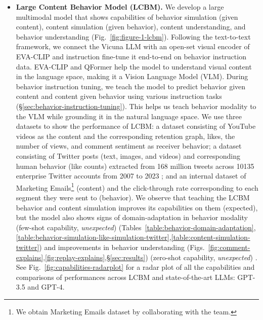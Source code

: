 \begin{itemize}[leftmargin=*]
    \item\textbf{Large Content Behavior Model (LCBM).} We develop a large multimodal model that shows capabilities of behavior simulation (given content), content simulation (given behavior), content understanding, and behavior understanding (Fig.~\ref{fig:figure-1-lcbm}). Following the text-to-text framework, we connect the Vicuna LLM \citep{touvron2023llama,vicuna2023} with an open-set visual encoder of EVA-CLIP \citep{sun2023eva} and instruction fine-tune it end-to-end on behavior instruction data. EVA-CLIP and QFormer \citep{li2023blip2} help the model to understand visual content in the language space, making it a Vision Language Model (VLM). During behavior instruction tuning, we teach the model to predict behavior given content and content given behavior using various instruction tasks (\S\ref{sec:behavior-instruction-tuning}). This helps us teach behavior modality to the VLM while grounding it in the natural language space. We use three datasets to show the performance of LCBM: a dataset consisting of YouTube videos as the content and the corresponding retention graph, likes, the number of views, and comment sentiment as receiver behavior; a dataset consisting of Twitter posts (text, images, and videos) and corresponding human behavior (like counts) extracted from 168 million tweets across 10135 enterprise Twitter accounts from 2007 to 2023 \cite{khurana2023behavior}; and an internal dataset of \companyName Marketing Emails\footnote[6]{We obtain \companyName Marketing Emails dataset by collaborating with the \companyName team.} (content) and the click-through rate corresponding to each segment they were sent to (behavior). We observe that teaching the LCBM behavior and content simulation improves its capabilities on them (expected), but the model also shows signs of domain-adaptation in behavior modality (few-shot capability, \textit{unexpected}) (Tables~\ref{table:behavior-domain-adaptation},\ref{table:behavior-simulation-like-simulation-twitter},\ref{table:content-simulation-twitter}) and improvements in behavior understanding (Figs.~\ref{fig:comment-explains},\ref{fig:replay-explains},\S\ref{sec:results}) (zero-shot capability, \textit{unexpected}) \citep{brown2020language}. See Fig.~\ref{fig:capabilities-radarplot} for a radar plot of all the capabilities and comparisons of performances across LCBM and state-of-the-art LLMs: GPT-3.5 and GPT-4.


\end{itemize}
